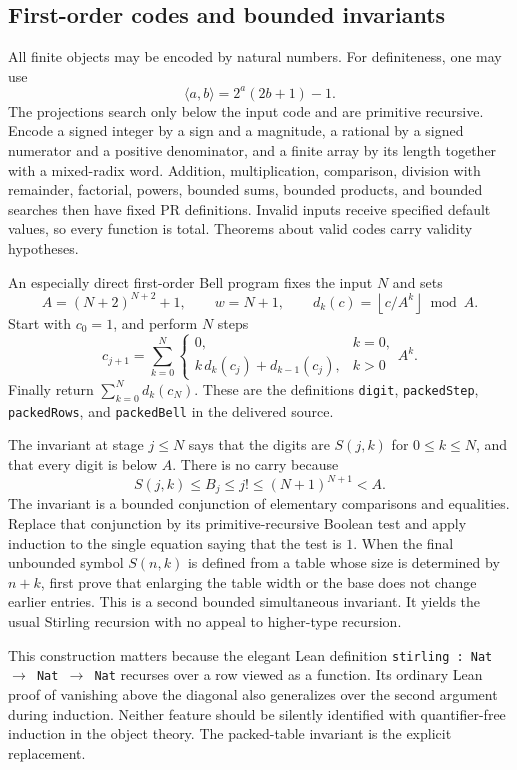 \subsection{First-order codes and bounded invariants}

All finite objects may be encoded by natural numbers. For definiteness,
one may use
\[
 \langle a,b\rangle=2^a(2b+1)-1.
\]
The projections search only below the input code and are primitive
recursive. Encode a signed integer by a sign and a magnitude, a rational
by a signed numerator and a positive denominator, and a finite array by
its length together with a mixed-radix word. Addition, multiplication,
comparison, division with remainder, factorial, powers, bounded sums,
bounded products, and bounded searches then have fixed PR definitions.
Invalid inputs receive specified default values, so every function is total.
Theorems about valid codes carry validity hypotheses.

An especially direct first-order Bell program fixes the input $N$ and sets
\[
 A=(N+2)^{N+2}+1,\qquad w=N+1,\qquad
 d_k(c)=\left\lfloor c/A^k\right\rfloor\bmod A.
\]
Start with $c_0=1$, and perform $N$ steps
\[
 c_{j+1}=\sum_{k=0}^{N}
 \begin{cases}
 0,&k=0,\\
 k\,d_k(c_j)+d_{k-1}(c_j),&k>0
 \end{cases} A^k.
\]
Finally return $\sum_{k=0}^{N}d_k(c_N)$. These are the definitions
\texttt{digit}, \texttt{packedStep}, \texttt{packedRows}, and
\texttt{packedBell} in the delivered source.

The invariant at stage $j\le N$ says that the digits are $S(j,k)$ for
$0\le k\le N$, and that every digit is below $A$. There is no carry because
\[
 S(j,k)\le B_j\le j!\le (N+1)^{N+1}<A.
\]
The invariant is a bounded conjunction of elementary comparisons and
equalities. Replace that conjunction by its primitive-recursive Boolean
test and apply induction to the single equation saying that the test is
$1$. When the final unbounded symbol $S(n,k)$ is defined from a table whose
size is determined by $n+k$, first prove that enlarging the table width or
the base does not change earlier entries. This is a second bounded
simultaneous invariant. It yields the usual Stirling recursion with no
appeal to higher-type recursion.

This construction matters because the elegant Lean definition
\texttt{stirling : Nat $\to$ Nat $\to$ Nat} recurses over a row viewed as a
function. Its ordinary Lean proof of vanishing above the diagonal also
generalizes over the second argument during induction. Neither feature
should be silently identified with quantifier-free induction in the
object theory. The packed-table invariant is the explicit replacement.

